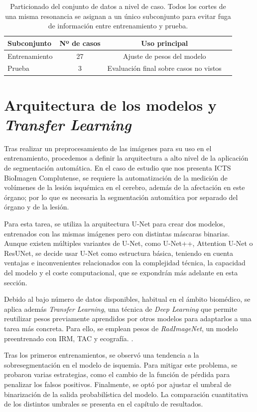 \begin{table}[H]
\centering
\begin{tabular}{lccc}
\hline
Subconjunto & Nº de casos & Uso principal \\
\hline
Entrenamiento & 27 & Ajuste de pesos del modelo \\
Prueba & 3 & Evaluación final sobre casos no vistos \\
\hline
\end{tabular}
\caption{Particionado del conjunto de datos a nivel de caso. Todos los cortes de una misma resonancia se asignan a un único subconjunto para evitar fuga de información entre entrenamiento y prueba.}
\label{tab:particionado_dataset}
\end{table}

\section{Arquitectura de los modelos y \textit{Transfer Learning}}

Tras realizar un preprocesamiento de las imágenes para su uso en el entrenamiento, procedemos a definir la arquitectura a alto nivel de la aplicación de segmentación automática. En el caso de estudio que nos presenta ICTS BioImagen Complutense, se requiere la automatización de la medición de volúmenes de la lesión isquémica en el cerebro, además de la afectación en este órgano; por lo que es necesaria la segmentación automática por separado del órgano y de la lesión.

Para esta tarea, se utiliza la arquitectura U-Net para crear dos modelos, entrenados con las mismas imágenes pero con distintas máscaras binarias. Aunque existen múltiples variantes de U-Net, como U-Net++, Attention U-Net o ResUNet, se decide usar U-Net como estructura básica, teniendo en cuenta ventajas e inconvenientes relacionados con la complejidad técnica, la capacidad del modelo y el coste computacional, que se expondrán más adelante en esta sección.

Debido al bajo número de datos disponibles, habitual en el ámbito biomédico, se aplica además \textit{Transfer Learning}, una técnica de \textit{Deep Learning} que permite reutilizar pesos previamente aprendidos por otros modelos para adaptarlos a una tarea más concreta. Para ello, se emplean pesos de \textit{RadImageNet}, un modelo preentrenado con IRM, TAC y ecografía. \citep{pan2010survey,mei2022radimagenet}.

Tras los primeros entrenamientos, se observó una tendencia a la sobresegmentación en el modelo de isquemia. Para mitigar este problema, se probaron varias estrategias, como el cambio de la función de pérdida para penalizar los falsos positivos. Finalmente, se optó por ajustar el umbral de binarización de la salida probabilística del modelo. La comparación cuantitativa de los distintos umbrales se presenta en el capítulo de resultados.

